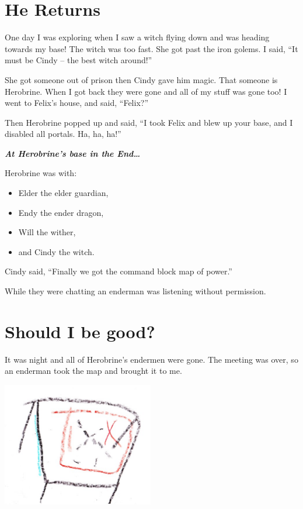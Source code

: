 \documentclass[booklet, twoside, 12pt]{krantz}
\providecommand{\tightlist}{%
  \setlength{\itemsep}{0pt}\setlength{\parskip}{0pt}}
\begin{document}
\clearpage

\hypertarget{he-returns}{%
\section{He Returns}\label{he-returns}}

One day I was exploring when I saw a witch flying down and was heading
towards my base! The witch was too fast. She got past the iron golems. I
said, ``It must be Cindy -- the best witch around!''

She got someone out of prison then Cindy gave him magic. That someone is
Herobrine. When I got back they were gone and all of my stuff was gone
too! I went to Felix's house, and said, ``Felix?''

Then Herobrine popped up and said, ``I took Felix and blew up your base,
and I disabled all portals. Ha, ha, ha!''

\textbf{\emph{At Herobrine's base in the End\ldots{}}}

Herobrine was with:

\begin{itemize}
\tightlist
\item
  Elder the elder guardian,
\item
  Endy the ender dragon,
\item
  Will the wither,
\item
  and Cindy the witch.
\end{itemize}

Cindy said, ``Finally we got the command block map of power.''

While they were chatting an enderman was listening without permission.

\hypertarget{should-i-be-good}{%
\section{Should I be good?}\label{should-i-be-good}}

It was night and all of Herobrine's endermen were gone. The meeting was
over, so an enderman took the map and brought it to me.

\includegraphics[width=2.60417in,height=\textheight]{img/final-war/table-and-map.jpg}
\end{document}
